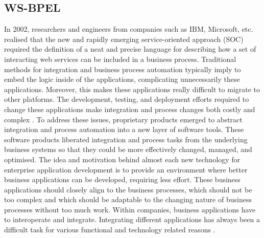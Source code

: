 \subsection {WS-BPEL}
In 2002, researchers and engineers from companies such as IBM, Microsoft, etc.
realised that the new and rapidly emerging service-oriented approach (SOC) required the definition of 
a neat and precise language for describing how a set of interacting web services can be included
in a business process. Traditional methods for integration and business process automation 
typically imply to embed the logic inside of the applications, complicating unnecessarily these applications. 
Moreover, this makes these applications really difficult to migrate to other platforms. 
The development, testing, and deployment efforts required 
to change these applications make integration and process changes both costly and complex \cite{bpelsoftcare}.
To address these issues, proprietary products emerged 
to abstract integration and process automation into a new layer of software tools. 
These software products liberated integration and process tasks from 
the underlying business systems so that they could be more effectively changed, managed, and optimised.
The idea and motivation behind almost each new technology for
enterprise application development is to provide an environment where better
business applications can be developed, requiring less effort. These business applications
should closely align to the business processes, which should not be too complex and
which should be adaptable to the changing nature of business processes without too much
work. Within companies, business applications have to
interoperate and integrate. Integrating different
applications has always been a difficult task for various functional and technology
related reasons \cite{}.


